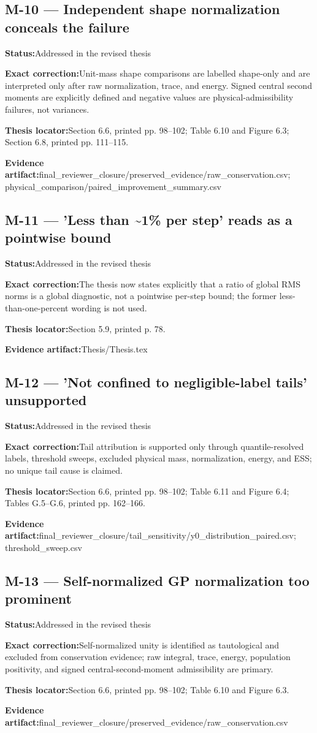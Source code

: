 \documentclass[11pt]{article}
\newcommand{\field}[2]{\textbf{#1}\quad #2\par}
\begin{document}
\subsection*{M-10 --- Independent shape normalization conceals the failure}
\field{Status:}{Addressed in the revised thesis}
\field{Exact correction:}{Unit-mass shape comparisons are labelled shape-only and are interpreted only after raw normalization, trace, and energy. Signed central second moments are explicitly defined and negative values are physical-admissibility failures, not variances.}
\field{Thesis locator:}{Section 6.6, printed pp. 98--102; Table 6.10 and Figure 6.3; Section 6.8, printed pp. 111--115.}
\field{Evidence artifact:}{final\_reviewer\_closure/preserved\_evidence/raw\_conservation.csv; physical\_comparison/paired\_improvement\_summary.csv}
\subsection*{M-11 --- 'Less than \textasciitilde{}1\% per step' reads as a pointwise bound}
\field{Status:}{Addressed in the revised thesis}
\field{Exact correction:}{The thesis now states explicitly that a ratio of global RMS norms is a global diagnostic, not a pointwise per-step bound; the former less-than-one-percent wording is not used.}
\field{Thesis locator:}{Section 5.9, printed p. 78.}
\field{Evidence artifact:}{Thesis/Thesis.tex}
\subsection*{M-12 --- 'Not confined to negligible-label tails' unsupported}
\field{Status:}{Addressed in the revised thesis}
\field{Exact correction:}{Tail attribution is supported only through quantile-resolved labels, threshold sweeps, excluded physical mass, normalization, energy, and ESS; no unique tail cause is claimed.}
\field{Thesis locator:}{Section 6.6, printed pp. 98--102; Table 6.11 and Figure 6.4; Tables G.5--G.6, printed pp. 162--166.}
\field{Evidence artifact:}{final\_reviewer\_closure/tail\_sensitivity/y0\_distribution\_paired.csv; threshold\_sweep.csv}
\subsection*{M-13 --- Self-normalized GP normalization too prominent}
\field{Status:}{Addressed in the revised thesis}
\field{Exact correction:}{Self-normalized unity is identified as tautological and excluded from conservation evidence; raw integral, trace, energy, population positivity, and signed central-second-moment admissibility are primary.}
\field{Thesis locator:}{Section 6.6, printed pp. 98--102; Table 6.10 and Figure 6.3.}
\field{Evidence artifact:}{final\_reviewer\_closure/preserved\_evidence/raw\_conservation.csv}
\end{document}
